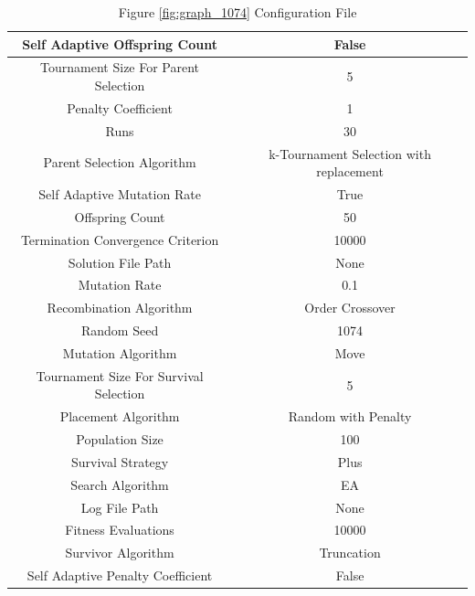 \documentclass{standalone}
\begin{document}
\begin{table}[!htb]
	\centering
	\caption{Figure \ref{fig:graph_1074} Configuration File}
	\label{tab:graph_1074}
	\begin{tabular}{| c | c |}
		\hline
		Self Adaptive Offspring Count		& False		 \\
		\hline
		Tournament Size For Parent Selection		& 5		 \\
		\hline
		Penalty Coefficient		& 1		 \\
		\hline
		Runs		& 30		 \\
		\hline
		Parent Selection Algorithm		& k-Tournament Selection with replacement		 \\
		\hline
		Self Adaptive Mutation Rate		& True		 \\
		\hline
		Offspring Count		& 50		 \\
		\hline
		Termination Convergence Criterion		& 10000		 \\
		\hline
		Solution File Path		& None		 \\
		\hline
		Mutation Rate		& 0.1		 \\
		\hline
		Recombination Algorithm		& Order Crossover		 \\
		\hline
		Random Seed		& 1074		 \\
		\hline
		Mutation Algorithm		& Move		 \\
		\hline
		Tournament Size For Survival Selection		& 5		 \\
		\hline
		Placement Algorithm		& Random with Penalty		 \\
		\hline
		Population Size		& 100		 \\
		\hline
		Survival Strategy		& Plus		 \\
		\hline
		Search Algorithm		& EA		 \\
		\hline
		Log File Path		& None		 \\
		\hline
		Fitness Evaluations		& 10000		 \\
		\hline
		Survivor Algorithm		& Truncation		 \\
		\hline
		Self Adaptive Penalty Coefficient		& False		 \\
		\hline
	\end{tabular}
\end{table}
\end{document}
